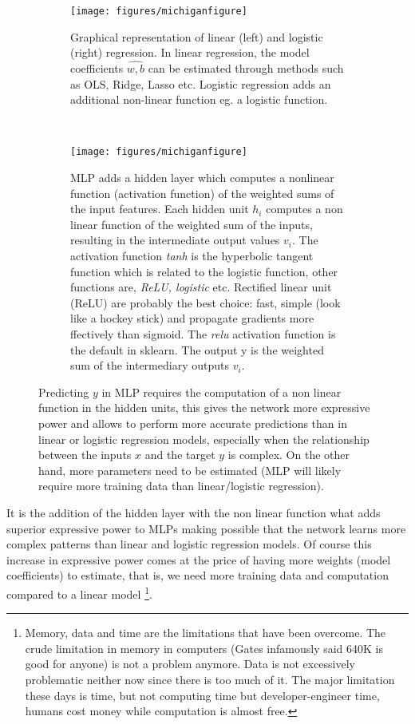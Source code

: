 \documentclass[11pt]{article}
\theoremstyle{definition}
\theoremstyle{remark}
\begin{document}
{\begin{figure}[H]
    \centering
    \begin{subfigure}[t]{.8\textwidth}
        \centering
        \texttt{[image: figures/michiganfigure]}
        \caption{Graphical representation of linear (left) and logistic (right) regression. In linear regression, the model coefficients $\hat{w,b}$ can be estimated through methods such as OLS, Ridge, Lasso etc. Logistic regression adds an additional non-linear function eg. a logistic function.}
    \end{subfigure}
    ~ 
    \begin{subfigure}[t]{.8\textwidth}
        \centering
        \texttt{[image: figures/michiganfigure]}
        \caption{MLP adds a hidden layer which computes a nonlinear function (activation function) of the weighted sums of the input features. Each hidden unit $h_i$ computes a non linear function of the weighted sum of the inputs, resulting in the intermediate output values $v_i$. The activation function \textit{tanh} is the hyperbolic tangent function which is related to the logistic function, other functions are, \textit{ReLU, logistic} etc. Rectified linear unit (ReLU) are probably the best choice: fast, simple (look like a hockey stick) and propagate gradients more ffectively than sigmoid. The \textit{relu} activation function is the default in sklearn. The output y is the weighted sum of the intermediary outputs $v_i$.}
    \end{subfigure}%
    \caption{Predicting $y$ in MLP requires the computation of a non linear function in the hidden units, this gives the network more expressive power and allows to perform more accurate predictions than in linear or logistic regression models, especially when the relationship between the inputs $x$ and the target $y$ is complex. On the other hand, more parameters need to be estimated (MLP will likely require more training data than linear/logistic regression).} \label{fig:mich}
\end{figure}

It is the addition of the hidden layer with the non linear function what adds superior expressive power to MLPs making possible that the network learns more complex patterns than linear and logistic regression models. Of course this increase in expressive power comes at the price of having more weights (model coefficients) to estimate, that is, we need more training data and computation compared to a linear model \footnote{Memory, data and time are the limitations that have been overcome. The crude limitation in memory in computers (Gates infamously said  640K is good for anyone) is not a problem anymore. Data is not excessively problematic neither now since there is too much of it. The major limitation these days is time, but not computing time but developer-engineer time, humans cost money while computation is almost free.}.

}
\end{document}
